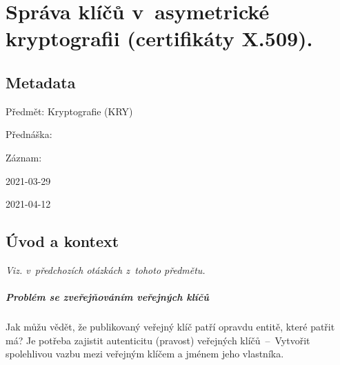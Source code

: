

\chapter{Správa klíčů v~asymetrické kryptografii (certifikáty X.509).}


\section{Metadata}

\begin{compactitem}
    \item Předmět: Kryptografie (KRY)
    \item Přednáška:
    \begin{compactitem}
        \item {}
    \end{compactitem}
    \item Záznam:
    \begin{compactitem}
        \item 2021-03-29
        \item 2021-04-12
    \end{compactitem}
\end{compactitem}


\section{Úvod a kontext}

\textit{Viz.  v~předchozích otázkách z~tohoto předmětu.}

\paragraph*{Problém se zveřejňováním veřejných klíčů} Jak můžu vědět, že publikovaný veřejný klíč patří opravdu entitě, které patřit má? Je potřeba zajistit autenticitu (pravost) veřejných klíčů~--~Vytvořit spolehlivou vazbu mezi veřejným klíčem a jménem jeho vlastníka.

